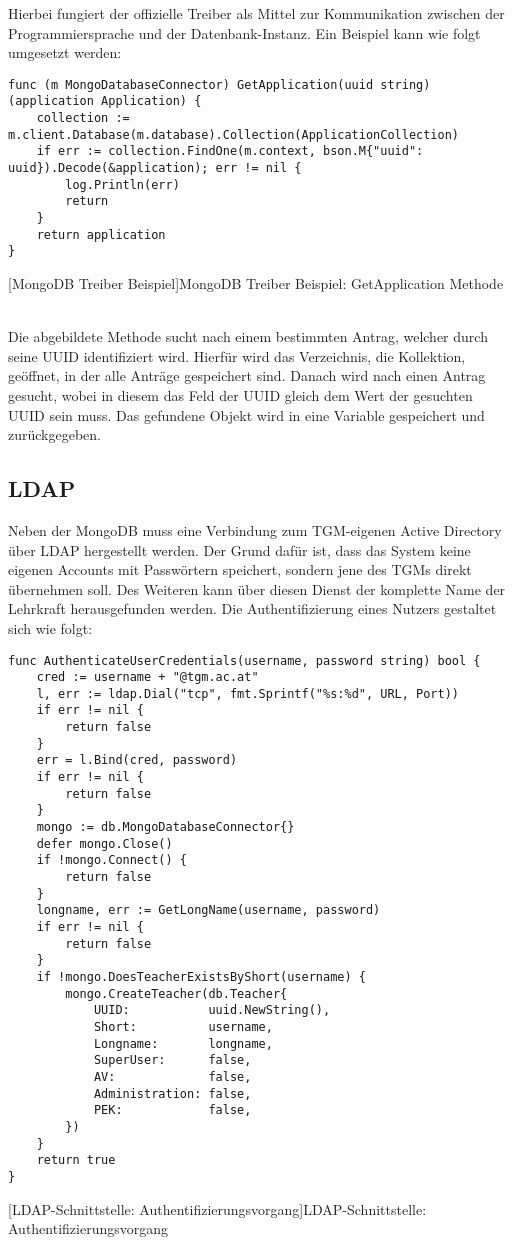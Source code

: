 \newpage

Hierbei fungiert der offizielle Treiber als Mittel zur Kommunikation zwischen der Programmiersprache und der Datenbank-Instanz. Ein Beispiel kann wie folgt umgesetzt werden:

\begin{verbatim}
func (m MongoDatabaseConnector) GetApplication(uuid string) (application Application) {
	collection := m.client.Database(m.database).Collection(ApplicationCollection)
	if err := collection.FindOne(m.context, bson.M{"uuid": uuid}).Decode(&application); err != nil {
		log.Println(err)
		return
	}
	return application
}
\end{verbatim}
[MongoDB Treiber Beispiel]{MongoDB Treiber Beispiel: GetApplication Methode}

~\\

Die abgebildete Methode sucht nach einem bestimmten Antrag, welcher durch seine UUID identifiziert wird. Hierfür wird das Verzeichnis, die Kollektion, geöffnet, in der alle Anträge gespeichert sind. \cite{mongogo} Danach wird nach einen Antrag gesucht, wobei in diesem das Feld der UUID gleich dem Wert der gesuchten UUID sein muss. Das gefundene Objekt wird in eine Variable gespeichert und zurückgegeben.

\newpage

\subsection{LDAP}

Neben der MongoDB muss eine Verbindung zum TGM-eigenen Active Directory über LDAP hergestellt werden. Der Grund dafür  ist, dass das System keine eigenen Accounts mit Passwörtern speichert, sondern jene des TGMs direkt übernehmen soll. Des Weiteren kann über diesen Dienst der komplette Name der Lehrkraft herausgefunden werden. Die Authentifizierung eines Nutzers gestaltet sich wie folgt:

\begin{verbatim}
func AuthenticateUserCredentials(username, password string) bool {
	cred := username + "@tgm.ac.at"
	l, err := ldap.Dial("tcp", fmt.Sprintf("%s:%d", URL, Port))
	if err != nil {
		return false
	}
	err = l.Bind(cred, password)
	if err != nil {
		return false
	}
	mongo := db.MongoDatabaseConnector{}
	defer mongo.Close()
	if !mongo.Connect() {
		return false
	}
	longname, err := GetLongName(username, password)
	if err != nil {
		return false
	}
	if !mongo.DoesTeacherExistsByShort(username) {
		mongo.CreateTeacher(db.Teacher{
			UUID:           uuid.NewString(),
			Short:          username,
			Longname:       longname,
			SuperUser:      false,
			AV:             false,
			Administration: false,
			PEK:            false,
		})
	}
	return true
}
\end{verbatim}
[LDAP-Schnittstelle: Authentifizierungsvorgang]{LDAP-Schnittstelle: Authentifizierungsvorgang \cite{go-ldap}}

